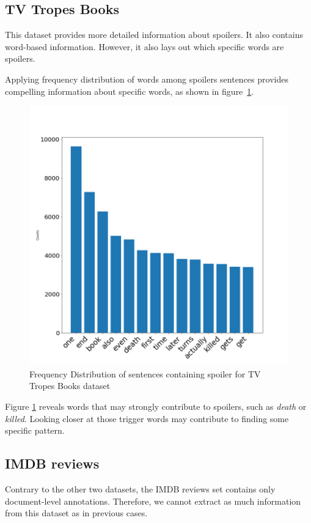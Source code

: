 \documentclass[11pt]{article}
\begin{document}
\subsection{TV Tropes Books}

This dataset provides more detailed information about spoilers. It also contains word-based information. However, it also lays out which specific words are spoilers.

Applying frequency distribution of words among spoilers sentences provides compelling information about specific words, as shown in figure~\ref{fig:freq-dist-troop}.

\begin{figure}
    \centering
    \includegraphics[width=\columnwidth]{img/FreqDistFiqure_Troops.png}
    \caption{Frequency Distribution of sentences containing spoiler for TV Tropes Books dataset} 
    \label{fig:freq-dist-troop}
\end{figure}

Figure \ref{fig:freq-dist-troop} reveals words that may strongly contribute to spoilers, such as \emph{death} or \emph{killed}. Looking closer at those trigger words may contribute to finding some specific pattern. 

\subsection{IMDB reviews}
Contrary to the other two datasets, the IMDB reviews set contains only document-level annotations. Therefore, we cannot extract as much information from this dataset as in previous cases.
\end{document}
